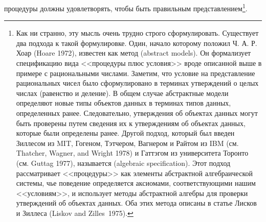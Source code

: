 процедуры должны удовлетворять, чтобы быть правильным представлением\footnote{Как ни странно, эту мысль очень трудно строго
сформулировать.  Существует два подхода к такой формулировке.  Один,
начало которому положил Ч.  А. Р. Хоар (Hoare 1972), 
известен как метод  
 (abstract models).  Он
формализует спецификацию вида <<процедуры плюс условия>> вроде
описанной выше в примере с рациональными числами.  Заметим, что
условие на представление рациональных чисел было сформулировано в
терминах утверждений о целых числах (равенство и деление).  В общем
случае абстрактные модели определяют новые типы объектов данных в
терминах типов данных, определенных ранее.  Следовательно, утверждения
об объектах данных могут быть проверены путем сведения их к
утверждениям об объектах данных, которые были определены ранее.
Другой подход, который был введен  Зиллесом из MIT,  Гогеном,
Тэтчером,
Вагнером 
и  Райтом из IBM (см. Thatcher, Wagner, and Wright 1978)
и  Гаттэгом из
университета Торонто (см. Guttag 1977), называется
 (algebraic specification).  Этот подход рассматривает <<процедуры>> как
элементы абстрактной алгебраической системы, чье поведение
определяется аксиомами, соответствующими нашим <<условиям>>, и
использует методы абстрактной алгебры для проверки утверждений об
объектах данных.  Оба этих метода описаны в статье  Лисков и  Зиллеса
(Liskov and Zilles~1975).
}.

